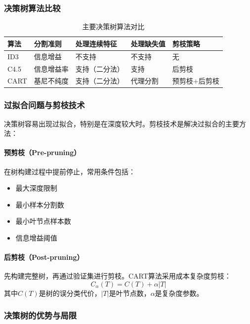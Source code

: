 \documentclass[UTF8]{report}
\theoremstyle{MyLineTheoremStyle} %
\theoremstyle{MyBlockTheoremStyle} %
\theoremstyle{MySubsubsectionStyle} %
\begin{document}
\subsubsection{决策树算法比较}

\begin{table}[h]
\centering
\caption{主要决策树算法对比}
\begin{tabular}{l p{2.5cm} p{3cm} p{3cm} p{3cm}}
\toprule
\textbf{算法} & \textbf{分割准则} & \textbf{处理连续特征} & \textbf{处理缺失值} & \textbf{剪枝策略} \\
\midrule
ID3 & 信息增益 & 不支持 & 不支持 & 无 \\
C4.5 & 信息增益率 & 支持（二分法） & 支持 & 后剪枝 \\
CART & 基尼不纯度 & 支持（二分法） & 代理分割 & 预剪枝+后剪枝 \\
\bottomrule
\end{tabular}
\end{table}

\subsubsection{过拟合问题与剪枝技术}

决策树容易出现过拟合，特别是在深度较大时。剪枝技术是解决过拟合的主要方法：

\paragraph{预剪枝（Pre-pruning）}
在树构建过程中提前停止，常用条件包括：
\begin{itemize}
    \item 最大深度限制
    \item 最小样本分割数
    \item 最小叶节点样本数
    \item 信息增益阈值
\end{itemize}

\paragraph{后剪枝（Post-pruning）}
先构建完整树，再通过验证集进行剪枝。CART算法采用成本复杂度剪枝：
\begin{equation}
C_\alpha(T) = C(T) + \alpha |T|
\end{equation}
其中$C(T)$是树的误分类代价，$|T|$是叶节点数，$\alpha$是复杂度参数。

\subsubsection{决策树的优势与局限}
\end{document}
